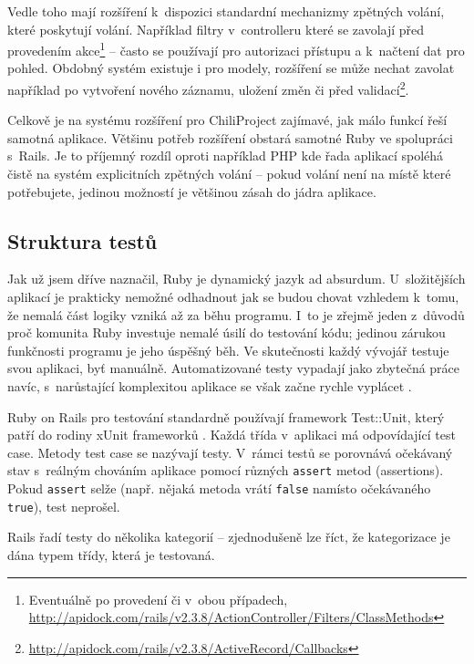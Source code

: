 \documentclass[thesis=B,czech]{FITthesis}[2012/05/02]
\begin{document}
Vedle toho mají rozšíření k~dispozici standardní mechanizmy zpětných
volání, které poskytují volání. Například filtry v~controlleru které se
zavolají před provedením akce\footnote{Eventuálně po provedení či v~obou
  případech,
  \url{http://apidock.com/rails/v2.3.8/ActionController/Filters/ClassMethods}}
-- často se používají pro autorizaci přístupu a k~načtení dat pro
pohled. Obdobný systém existuje i pro modely, rozšíření se může nechat
zavolat například po vytvoření nového záznamu, uložení změn či před
validací\footnote{\url{http://apidock.com/rails/v2.3.8/ActiveRecord/Callbacks}}.

Celkově je na systému rozšíření pro ChiliProject zajímavé, jak málo
funkcí řeší samotná aplikace. Většinu potřeb rozšíření obstará samotné
Ruby ve spolupráci s~Rails. Je to příjemný rozdíl oproti například PHP
kde řada aplikací spoléhá čistě na systém explicitních zpětných volání
-- pokud volání není na místě které potřebujete, jedinou možností je
většinou zásah do jádra aplikace.

\subsection{Struktura testů}

\label{sec:rails_tests}

Jak už jsem dříve naznačil, Ruby je dynamický jazyk ad absurdum.
U~složitějších aplikací je prakticky nemožné odhadnout jak se budou chovat
vzhledem k~tomu, že nemalá část logiky vzniká až za běhu programu. I~to
je zřejmě jeden z~důvodů proč komunita Ruby investuje nemalé úsilí do
testování kódu; jedinou zárukou funkčnosti programu je jeho úspěšný běh.
Ve skutečnosti každý vývojář testuje svou aplikaci, byť manuálně.
Automatizované testy vypadají jako zbytečná práce navíc, s~narůstající
komplexitou aplikace se však začne rychle vyplácet \citep{Rappin2011}.

Ruby on Rails pro testování standardně používají framework Test::Unit,
který patří do rodiny xUnit frameworků \citep{FowlerXunit}. Každá třída
v~aplikaci má odpovídající test case. Metody test case se nazývají
testy. V~rámci testů se porovnává očekávaný stav s~reálným chováním
aplikace pomocí různých \lstinline!assert! metod (assertions). Pokud
\lstinline!assert! selže (např. nějaká metoda vrátí \lstinline!false!
namísto očekávaného \lstinline!true!), test neprošel.

Rails řadí testy do několika kategorií -- zjednodušeně lze říct, že
kategorizace je dána typem třídy, která je testovaná.
\end{document}
